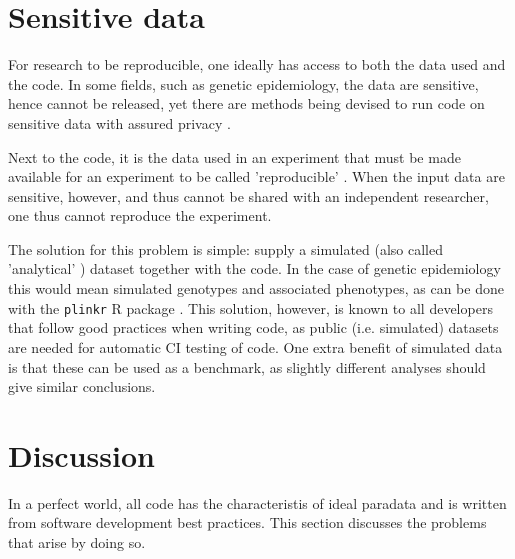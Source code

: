 \section{Sensitive data}\label{sec:sensitive-data}

For research to be reproducible, one ideally has access to
both the data used and the code.
In some fields, such as genetic epidemiology, the data are
sensitive, hence cannot be released,
yet there are methods being devised to run code on sensitive
data with assured privacy \cite{zhang2016review,azencott2018machine}.

Next to the code, it is the data used in an experiment 
that must be made available for an experiment 
to be called 'reproducible' \cite{peng2006reproducible}.
When the input data are sensitive, however, and thus cannot be shared with
an independent researcher, one thus cannot reproduce the
experiment.

The solution for this problem is simple:
supply a simulated (also called 'analytical' \cite{peng2006reproducible}) dataset
together with the code.
In the case of genetic epidemiology this would mean
simulated genotypes and associated phenotypes,
as can be done with the \verb|plinkr| R package \cite{plinkr}.
This solution, however, is known to all developers that follow
good practices when writing code, as public (i.e. simulated) 
datasets are needed for automatic CI testing of code.
One extra benefit of simulated data is that these can be used
as a benchmark, as slightly different analyses should give 
similar conclusions.

\section{Discussion}

In a perfect world, all code has the characteristis of ideal paradata
and is written from software development best practices.
This section discusses the problems that arise by doing so.


